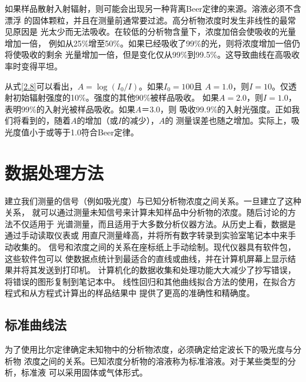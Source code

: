 如果样品散射入射辐射，则可能会出现另一种背离Beer定律的来源。溶液必须不含漂浮
的固体颗粒，并且在测量前通常要过滤。高分析物浓度时发生非线性的最常见原因是
光太少而无法吸收。在较低的分析物含量下，浓度加倍会使吸收的光量增加一倍，
例如从25\%增至50\%。如果已经吸收了99\%的光，则将浓度增加一倍仍将使吸收的剩余
光量增加一倍，但是变化仅从99\%到99.5\%。这导致曲线在高吸收率时变得平坦。

从式\ref{2.8}可以看出，$A = \log\left(I_0/I\right)$。如果$I_0 = 100$且
$A = 1.0$，则$I =10$。仅透射初始辐射强度的10\%。强度的其他90\%被样品吸收。
如果$A = 2.0$，则$I = 1.0$，表明99\%的入射光被样品吸收。如果$A ＝ 3.0$，则
吸收99.9\%的入射光强度。正如我们将看到的，随着$A$的增加（或$I$的减少），$A$的
测量误差也随之增加。实际上，吸光度值小于或等于1.0符合Beer定律。
\section{数据处理方法}
建立我们测量的信号（例如吸光度）与已知分析物浓度之间关系。一旦建立了这种关系，
就可以通过测量未知信号来计算未知样品中分析物的浓度。随后讨论的方法不仅适用于
光谱测量，而且适用于大多数分析仪器方法。从历史上看，数据是通过手动读取仪表或
用直尺测量峰高，并将所有数字转录到实验室笔记本中来手动收集的。
信号和浓度之间的关系在座标纸上手动绘制。现代仪器具有软件包，这些软件包可以
使数据点统计到最适合的直线或曲线，并在计算机屏幕上显示结果并将其发送到打印机。
计算机化的数据收集和处理功能大大减少了抄写错误，将错误的图形复制到笔记本中。
线性回归和其他曲线拟合方法的使用，在拟合方程式和从方程式计算出的样品结果中
提供了更高的准确性和精确度。
\subsection{标准曲线法}
为了使用比尔定律确定未知物中的分析物浓度，必须确定给定波长下的吸光度与分析物
浓度之间的关系。已知浓度分析物的溶液称为标准溶液。对于某些类型的分析，标准液
可以采用固体或气体形式。

